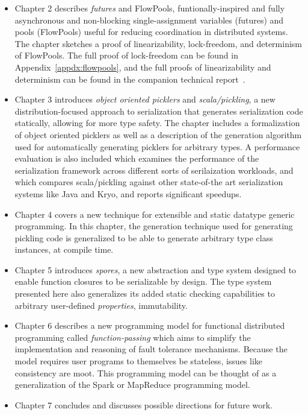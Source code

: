 \begin{itemize}

	\item Chapter 2 describes {\em futures} and {FlowPools}, funtionally-inspired
	and fully asynchronous and non-blocking single-assignment variables (futures)
	and pools (FlowPools) useful for reducing coordination in distributed systems.
	The chapter sketches a proof of linearizability, lock-freedom, and determinism
	of FlowPools. The full proof of lock-freedom can be found in
	Appendix~\ref{appdx:flowpools}, and the full proofs of linearizability and
	determinism can be found in the companion technical report~\cite{Prokopec12}.

	\item Chapter 3 introduces {\em object oriented picklers} and {\em
	scala/pickling}, a new distribution-focused approach to serialization that
	generates serialization code statically, allowing for more type safety. The
	chapter includes a formalization of object oriented picklers as well as a
	description of the generation algorithm used for automatically generating
	picklers for arbitrary types. A performance evaluation is also included which
	examines the performance of the serialization framework across different sorts
	of serilaization workloads, and which compares scala/pickling against other
	state-of-the art serialization systems like Java and Kryo, and reports
	significant speedups.

	\item Chapter 4 covers a new technique for extensible and static datatype
	generic programming. In this chapter, the generation technique used for
	generating pickling code is generalized to be able to generate arbitrary type
	class instances, at compile time.

	\item Chapter 5 introduces {\em spores}, a new abstraction and type system
	designed to enable function closures to be serializable by design. The type
	system presented here also generalizes its added static checking capabilities
	to arbitrary user-defined {\em properties}, \eg immutability.

	\item Chapter 6 describes a new programming model for functional distributed
	programming called {\em function-passing} which aims to simplify the
	implementation and reasoning of fault tolerance mechanisms. Because the model
	requires user programs to themselves be stateless, issues like consistency are
	moot. This programming model can be thought of as a generalization of the Spark
	or MapReduce programming model.

	\item Chapter 7 concludes and discusses possible directions for future work.

\end{itemize}

